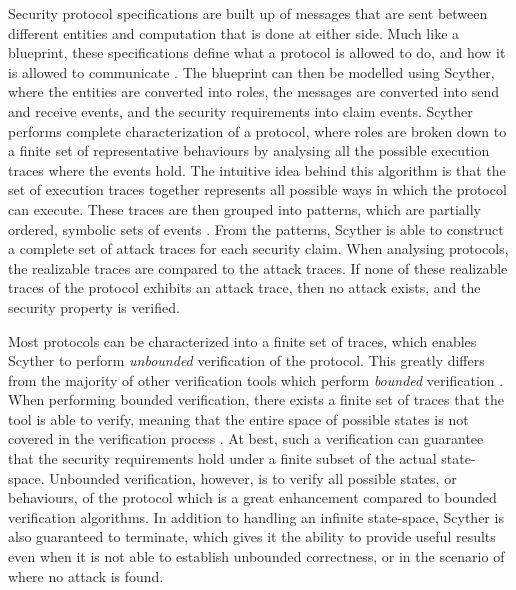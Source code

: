 Security protocol specifications are built up of messages that are sent between different entities and computation that is done at either side. Much like a blueprint, these specifications define what a protocol is allowed to do, and how it is allowed to communicate \cite{cremers2003defining}. The blueprint can then be modelled using Scyther, where the entities are converted into roles, the messages are converted into send and receive events, and the security requirements into claim events. Scyther performs complete characterization of a protocol, where roles are broken down to a finite set of representative behaviours by analysing all the possible execution traces where the events hold. The intuitive idea behind this algorithm is that the set of execution traces together represents all possible ways in which the protocol can execute. These traces are then grouped into patterns, which are partially ordered, symbolic sets of events \cite{cremers2006scyther}. From the patterns, Scyther is able to construct a complete set of attack traces for each security claim. When analysing protocols, the realizable traces are compared to the attack traces. If none of these realizable traces of the protocol exhibits an attack trace, then no attack exists, and the security property is verified. 

Most protocols can be characterized into a finite set of traces, which enables Scyther to perform \emph{unbounded} verification of the protocol. This greatly differs from the majority of other verification tools which perform \emph{bounded} verification \cite{cremers2008scyther, cremers2009comparing}. When performing bounded verification, there exists a finite set of traces that the tool is able to verify, meaning that the entire space of possible states is not covered in the verification process \cite{cremers2008unbounded}. At best, such a verification can guarantee that the security requirements hold under a finite subset of the actual state-space. Unbounded verification, however, is to verify all possible states, or behaviours, of the protocol which is a great enhancement compared to bounded verification algorithms. In addition to handling an infinite state-space, Scyther is also guaranteed to terminate, which gives it the ability to provide useful results even when it is not able to establish unbounded correctness, or in the scenario of where no attack is found.

